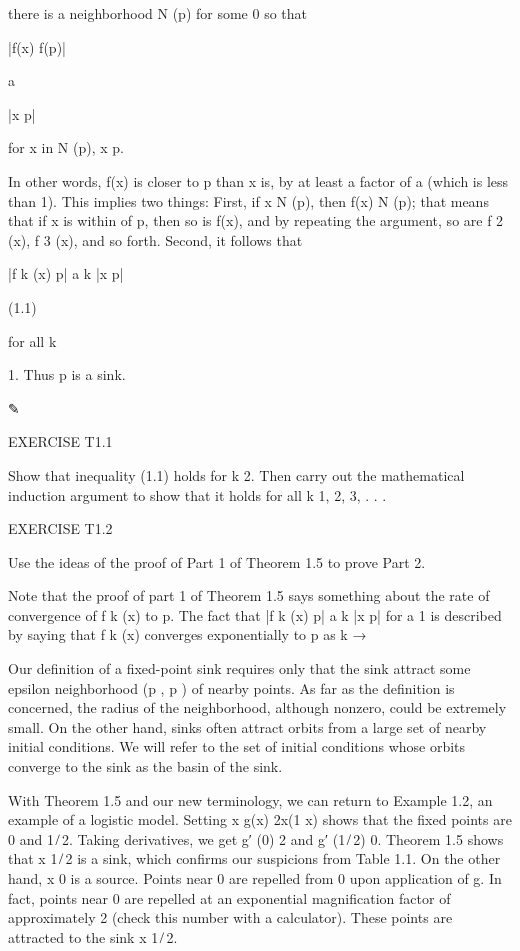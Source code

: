 there is a neighborhood N  (p) for some  
 0 so that

|f(x)  f(p)|

 a

|x  p|

for x in N  (p), x p.

In other words, f(x) is closer to p than x is, by at least a factor of a (which is less than 1). This 
implies two things: First, if x  N  (p), then f(x)  N  (p); that means that if x is within  of p, then so 
is f(x), and by repeating the argument, so are f 2 (x), f 3 (x), and so forth. Second, it follows that

|f k (x)  p| a k |x  p|

(1.1)

for all k


 1. Thus p is a sink.

✎

EXERCISE T1.1

Show that inequality (1.1) holds for k  2. Then carry out the mathematical induction argument to show that 
it holds for all k  1, 2, 3, . . .

EXERCISE T1.2

Use the ideas of the proof of Part 1 of Theorem 1.5 to prove Part 2.

Note that the proof of part 1 of Theorem 1.5 says something about the rate of convergence of f k (x) to p. 
The fact that |f k (x)  p| a k |x  p| for a  1 is described by saying that f k (x) converges exponentially 
to p as k → 


Our deﬁnition of a ﬁxed-point sink requires only that the sink attract some epsilon neighborhood (p  , p  
) of nearby points. As far as the deﬁnition is concerned, the radius  of the neighborhood, although 
nonzero, could be extremely small. On the other hand, sinks often attract orbits from a large set of nearby 
initial conditions. We will refer to the set of initial conditions whose orbits converge to the sink as the 
basin of the sink.

With Theorem 1.5 and our new terminology, we can return to Example 1.2, an example of a logistic model. 
Setting x  g(x)  2x(1  x) shows that the ﬁxed points are 0 and 1 ̸ 2. Taking derivatives, we get g′ (0)  2 
and g′ (1 ̸ 2)  0. Theorem 1.5 shows that x  1 ̸ 2 is a sink, which conﬁrms our suspicions from Table 1.1. 
On the other hand, x  0 is a source. Points near 0 are repelled from 0 upon application of g. In fact, 
points near 0 are repelled at an exponential magniﬁcation factor of approximately 2 (check this number 
with a calculator). These points are attracted to the sink x  1 ̸ 2.

